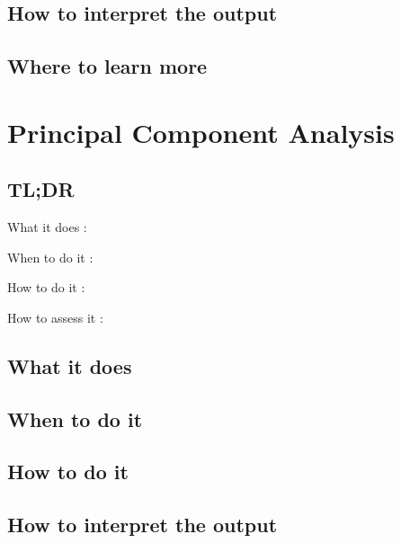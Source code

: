 \documentclass[
]{book}
\begin{document}
\hypertarget{how-to-interpret-the-output-20}{%
\section{How to interpret the output}\label{how-to-interpret-the-output-20}}

\hypertarget{where-to-learn-more-20}{%
\section{Where to learn more}\label{where-to-learn-more-20}}

\hypertarget{principal-component-analysis}{%
\chapter{Principal Component Analysis}\label{principal-component-analysis}}

\hypertarget{tldr-21}{%
\section{TL;DR}\label{tldr-21}}

What it does
:

When to do it
:

How to do it
:

How to assess it
:

\hypertarget{what-it-does-21}{%
\section{What it does}\label{what-it-does-21}}

\hypertarget{when-to-do-it-21}{%
\section{When to do it}\label{when-to-do-it-21}}

\hypertarget{how-to-do-it-21}{%
\section{How to do it}\label{how-to-do-it-21}}

\hypertarget{how-to-interpret-the-output-21}{%
\section{How to interpret the output}\label{how-to-interpret-the-output-21}}
\end{document}
